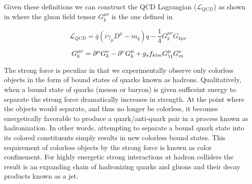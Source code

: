 Given these definitions we can construct the QCD Lagrangian
($\mathcal{L}_{QCD}$) as shown in  where the
gluon field tensor $G_{k}^{\mu\nu}$ is the one defined in

\begin{equation} \label{eq:qcd:qcd_lagrangian}
\mathcal{L}_{QCD} = \bar{q}(i\gamma_{\mu}D^{\mu} - m_{q})q -
\frac{1}{4}G_{k}^{\mu\nu}G_{k\mu\nu}
\end{equation}

\begin{equation} \label{eq:qcd:gluon_tensor}
G_{k}^{\mu\nu} = \partial^{\mu}G_{k}^{\nu} - \partial^{\nu}G_{k}^{\mu} +
g_{s}f_{klm}G_{\l}^{\mu}G_{m}^{\nu}
\end{equation}

The strong force is peculiar in that we experimentally observe only colorless
objects in the form of bound states of quarks known as hadrons.  Qualitatively,
when a bound state of quarks (meson or baryon) is given sufficeint energy to
separate the strong force dramatically increases in strength.  At the point
where the objects would separate, and thus no longer be colorless, it becomes
energetically favorable to produce a quark/anti-quark pair in a process known as
hadronization.  In other words, attempting to separate a bound quark state into
its colored constituents simply results in new colorless bound states.  This
requirement of colorless objects by the strong force is known as color
confinement. For highly energetic strong interactions at hadron colliders the
result is an expanding chain of hadronizing quarks and gluons and their decay
products known as a jet.

